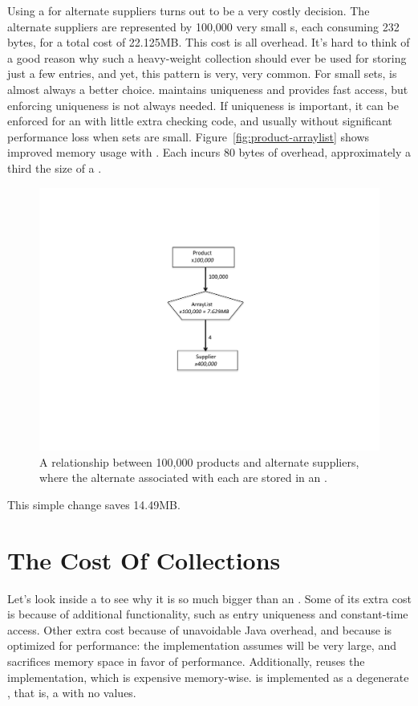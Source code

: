 Using a  for alternate suppliers turns out to be a
very costly decision. The alternate suppliers are represented by 100,000
very small s, each consuming 232 bytes, for a total cost of 22.125MB. 
This cost is all overhead.
It's hard to think of a good reason why such a heavy-weight collection should ever be used
 for storing just a few entries, and yet, this pattern is very, very common. For
 small sets,  is almost always a better choice.  maintains uniqueness
  and provides fast access, but enforcing uniqueness
is not always needed. If uniqueness is
important, it can be enforced for an  
 with  little extra checking code, and usually without significant performance
 loss when sets are small. Figure~\ref{fig:product-arraylist} shows improved
 memory usage with . Each  incurs 80 bytes of overhead,
approximately a third the size of a .
 \begin{figure}
  \centering
 \includegraphics[width=.80\textwidth]{part1/Figures/collections/product-arraylist.pdf}
 \caption{A relationship between 100,000 products and alternate suppliers,
 where the alternate  associated with each  are
 stored in an .}
  \label{fig:graph-arraylist}
\end{figure}
This simple change saves 14.49MB. 


\section{The Cost Of Collections}
\label{sec:collectioncost}
Let's look inside a  to see why it is so much bigger than an
. Some of its extra cost is because of additional
functionality, such as entry uniqueness and constant-time access. Other extra
cost because of unavoidable Java overhead, and because
 is optimized for performance: the  implementation
assumes  will be very large, and sacrifices memory space in favor of performance. 
Additionally,  reuses the  implementation, which
is expensive memory-wise.  is implemented as a degenerate
, that is, a  with no values. 

